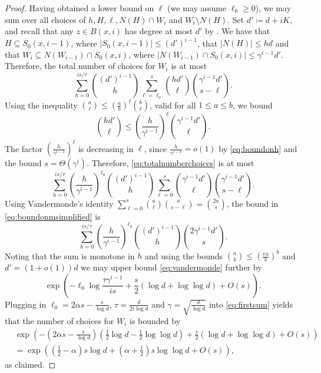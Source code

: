 \documentclass[reqno,a4paper,11pt]{amsart}
\theoremstyle{definition}
\renewcommand{\leq}{\leqslant}
\renewcommand{\geq}{\geqslant}
\begin{document}
\begin{proof}
  Having obtained a lower bound on $\ell$ (we may assume $\ell_0 \geq 0$), we may sum over all choices of $h, H, \ell, N(H) \cap W_i$ and $W_i \setminus N(H)$.
  Set $d' \coloneqq d+iK$, and recall that any $z \in B(x, i)$ has degree at most $d'$ by .
  We have that $H \subseteq S_0(x, i-1)$, where $|S_0(x, i-1)| \leq (d')^{i-1}$, that $|N(H)| \leq hd$ and that $W_i \subseteq N(W_{i-1}) \cap S_0(x, i)$, where $|N(W_{i-1}) \cap S_0(x, i)| \leq \gamma^{i-1} d'$.
  Therefore, the total number of choices for $W_i$ is at most
  \begin{equation}\label{eq:totalnumberchoices}
    \sum_{h=0}^{is/\tau} \binom{(d')^{i-1}}{h} \sum_{\ell=\ell_0}^s \binom{hd'}{\ell} \binom{\gamma^{i-1} d'}{s - \ell}.
  \end{equation}
    Using the inequality $\binom{a}{\ell} \leq (\frac{a}{b})^{\ell} \binom{b}{\ell}$, valid for all $1 \leq a \leq b$, we bound
    \[
    \binom{hd'}{\ell} \leq \left(\frac{h}{\gamma^{i-1}}\right)^{\ell} \binom{\gamma^{i-1}d'}{\ell}.
  \]
  The factor $\left(\frac{h}{\gamma^{i-1}}\right)^\ell$ is decreasing in $\ell$, since $\frac{h}{\gamma^{i-1}} = o(1)$ by \eqref{eq:boundonh} and the bound $s = \Theta(\gamma^i)$.
  Therefore, \eqref{eq:totalnumberchoices} is at most
  \begin{equation}\label{eq:boundonmsimplified}
    \sum_{h=0}^{is/\tau} \left(\frac{h}{\gamma^{i-1}}\right)^{\ell_0} \binom{(d')^{i-1}}{h} \sum_{\ell=0}^s \binom{\gamma^{i-1} d'}{\ell} \binom{\gamma^{i-1} d'}{s-\ell}.
  \end{equation}
  Using Vandermonde's identity $\sum_{\ell=0}^s \binom{a}{\ell} \binom{a}{s-\ell}= \binom{2a}{s}$, the bound in \eqref{eq:boundonmsimplified} is
  \begin{equation}\label{eq:vandermonde}
    \sum_{h=0}^{is/\tau} \left(\frac{h}{\gamma^{i-1}}\right)^{\ell_0} \binom{(d') ^{i-1}}{h} \binom{2 \gamma^{i-1} d'}{s}.
  \end{equation}
  Noting that the sum is monotone in $h$ and using the bounds $\binom{a}{b} \leq \left(\frac{ea}{b}\right)^b$ and $d' = (1+o(1))d$ we may upper bound \eqref{eq:vandermonde} further by
  \begin{equation}\label{eq:firstsum}
    \exp\left(- \ell_0 \log \frac{\tau \gamma^{i-1}}{is} +\frac{s}{2}(\log d + \log \log d)+ O(s)\right).
  \end{equation}
  Plugging in $\ell_0=2 \alpha s - \frac{s}{\log d}$, $\tau=\frac{d}{2i\log d}$ and $\gamma=\sqrt{\frac{d}{\log d}}$ into \eqref{eq:firstsum} yields that the number of choices for $W_i$ is bounded by
  \[
    \begin{split}
      &\exp\left(-\left(2 \alpha s - \frac{s}{\log d}\right)\left(\frac{1}{2} \log d - \frac{1}{2} \log \log d\right) +\frac{s}{2}(\log d + \log \log d)+ O(s)\right)\\
      &=\exp\left(\left(\frac{1}{2}-\alpha\right)s \log d + \left(\alpha+\frac{1}{2}\right) s \log \log d +O(s)\right),
    \end{split}
  \]
  as claimed.
\end{proof}
\end{document}
